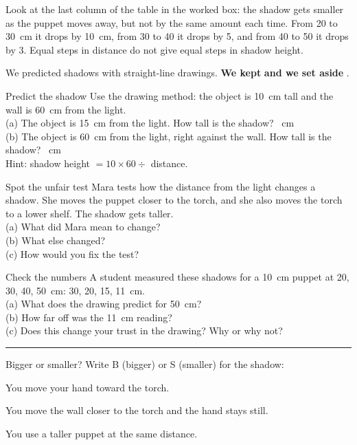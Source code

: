 Look at the last column of the table in the worked box: the shadow gets smaller as the puppet moves away, but not by the same amount each time. From 20 to 30~cm it drops by 10~cm, from 30 to 40 it drops by 5, and from 40 to 50 it drops by 3. Equal steps in distance do not give equal steps in shadow height.

\begin{keepbox}
We predicted shadows with straight-line drawings. \textbf{We kept} \wline[3.4cm] \textbf{and we set aside} \wline[3.4cm].
\end{keepbox}

\begin{puzzle}{Predict the shadow}
Use the drawing method: the object is 10~cm tall and the wall is 60~cm from the light.\\
(a) The object is 15~cm from the light. How tall is the shadow? \wline[2cm]~cm\\
(b) The object is 60~cm from the light, right against the wall. How tall is the shadow? \wline[2cm]~cm\\
Hint: shadow height $=10\times60\div$ distance.
\end{puzzle}

\begin{puzzle}{Spot the unfair test}
Mara tests how the distance from the light changes a shadow. She moves the puppet closer to the torch, and she also moves the torch to a lower shelf. The shadow gets taller.\\
(a) What did Mara mean to change? \wline[4cm]\\
(b) What else changed? \wline[4cm]\\
(c) How would you fix the test? \wline[4cm]
\end{puzzle}

\begin{puzzle}{Check the numbers}
A student measured these shadows for a 10~cm puppet at 20, 30, 40, 50~cm: 30, 20, 15, 11~cm.\\
(a) What does the drawing predict for 50~cm? \wline[1.5cm]\\
(b) How far off was the 11~cm reading? \wline[1.5cm]\\
(c) Does this change your trust in the drawing? Why or why not?\\
\rule{\linewidth}{0.5pt}
\end{puzzle}

\begin{puzzle}{Bigger or smaller?}
Write B (bigger) or S (smaller) for the shadow:
\begin{description}[leftmargin=1.6em,itemsep=0.3em,style=sameline]
\item[(a)] You move your hand toward the torch. \wline[1cm]
\item[(b)] You move the wall closer to the torch and the hand stays still. \wline[1cm]
\item[(c)] You use a taller puppet at the same distance. \wline[1cm]
\end{description}
\end{puzzle}
\clearpage

